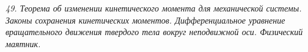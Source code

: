 \emph{49. Теорема об изменении кинетического момента для механической системы.
Законы сохранения кинетических моментов. Дифференциальное уравнение
вращательного движения твердого тела вокруг неподвижной оси. Физический
маятник.}

\newpage
